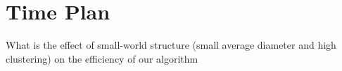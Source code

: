 \chapter{Time Plan}
What is the effect of small-world structure (small average diameter and high clustering) on the efficiency of our algorithm
  